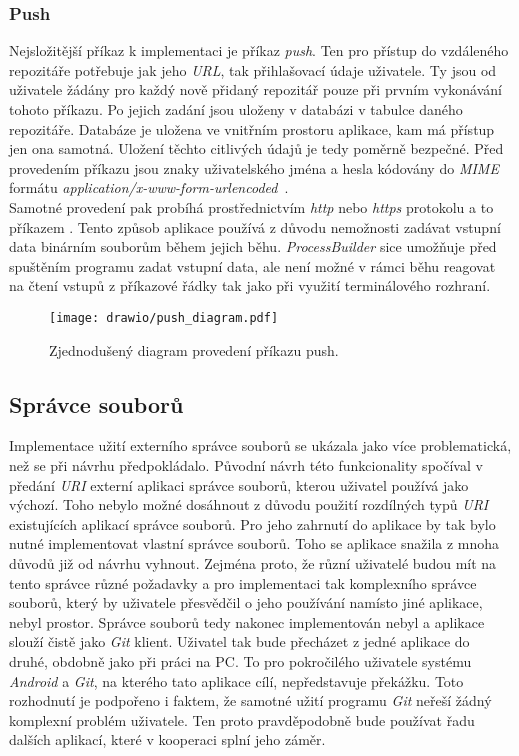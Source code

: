         \subsubsection{Push}
        Nejsložitější příkaz k implementaci je příkaz \emph{push}. Ten pro přístup do vzdáleného repozitáře potřebuje jak jeho \emph{URL}, tak přihlašovací údaje uživatele. Ty jsou od uživatele žádány pro každý nově přidaný repozitář pouze při prvním vykonávání tohoto příkazu. Po jejich zadání jsou uloženy v databázi v tabulce daného repozitáře. Databáze je uložena ve vnitřním prostoru aplikace, kam má přístup jen ona samotná. Uložení těchto citlivých údajů je tedy poměrně bezpečné. Před provedením příkazu jsou znaky uživatelského jména a hesla kódovány do \emph{MIME} formátu \emph{application/x-www-form-urlencoded}~.\\ Samotné provedení pak probíhá prostřednictvím \emph{http} nebo \emph{https} protokolu a to příkazem .
        Tento způsob aplikace používá z důvodu nemožnosti zadávat vstupní data binárním souborům během jejich běhu. \emph{ProcessBuilder} sice umožňuje před spuštěním programu zadat vstupní data, ale není možné v rámci běhu reagovat na čtení vstupů z příkazové řádky tak jako při využití terminálového rozhraní.

        \newpage
        \begin{figure}[h]
            \centering
            \vspace{0.5cm}
            \texttt{[image: drawio/push\_diagram.pdf]}
            \caption[Diagram provedení příkazu push]{Zjednodušený diagram provedení příkazu push.}
            \label{diagram:push}
        \end{figure}
    
    \subsection{Správce souborů}
    Implementace užití externího správce souborů se ukázala jako více problematická, než se při návrhu předpokládalo. Původní návrh této funkcionality spočíval v předání \emph{URI} externí aplikaci správce souborů, kterou uživatel používá jako výchozí. Toho nebylo možné dosáhnout z důvodu použití rozdílných typů \emph{URI} existujících aplikací správce souborů. Pro jeho zahrnutí do aplikace by tak bylo nutné implementovat vlastní správce souborů. Toho se aplikace snažila z mnoha důvodů již od návrhu vyhnout. Zejména proto, že různí uživatelé budou mít na tento správce různé požadavky a pro implementaci tak komplexního správce souborů, který by uživatele přesvědčil o jeho používání namísto jiné aplikace, nebyl prostor. Správce souborů tedy nakonec implementován nebyl a aplikace slouží čistě jako \emph{Git} klient. Uživatel tak bude přecházet z jedné aplikace do druhé, obdobně jako při práci na PC. To pro pokročilého uživatele systému \emph{Android} a \emph{Git}, na kterého tato aplikace cílí, nepředstavuje překážku.
    Toto rozhodnutí je podpořeno i faktem, že samotné užití programu \emph{Git} neřeší žádný komplexní problém uživatele. Ten proto pravděpodobně bude používat řadu dalších aplikací, které v kooperaci splní jeho záměr.

